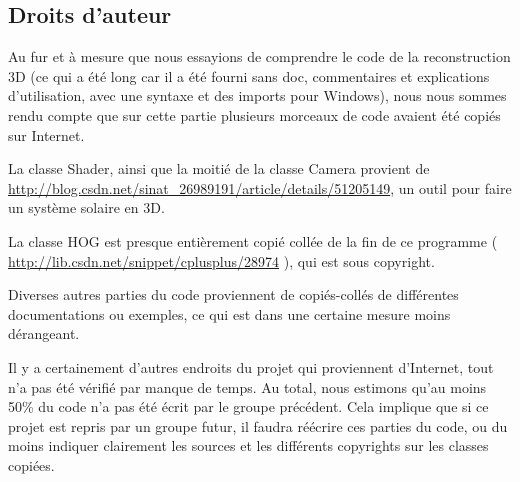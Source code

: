 \subsection{Droits d'auteur}
Au fur et à mesure que nous essayions de comprendre le code de la reconstruction 3D (ce qui a été long car il a été fourni sans doc, commentaires et explications d'utilisation, avec une syntaxe et des imports pour Windows), nous nous sommes rendu compte que sur cette partie plusieurs morceaux de code avaient été copiés sur Internet.

La classe Shader, ainsi que la moitié de la classe Camera provient de \url{http://blog.csdn.net/sinat_26989191/article/details/51205149}, un outil pour faire un système solaire en 3D.

La classe HOG est presque entièrement copié collée de la fin de ce programme ( \url{http://lib.csdn.net/snippet/cplusplus/28974} ), qui est sous copyright.

Diverses autres parties du code proviennent de copiés-collés de différentes documentations ou exemples, ce qui est dans une certaine mesure moins dé\-ran\-geant.

Il y a certainement d'autres endroits du projet qui proviennent d'Internet, tout n'a pas été vérifié par manque de temps. Au total, nous estimons qu'au moins 50\% du code n'a pas été écrit par le groupe précédent. Cela implique que si ce projet est repris par un groupe futur, il faudra réécrire ces parties du code, ou du moins indiquer clairement les sources et les différents copyrights sur les classes copiées.